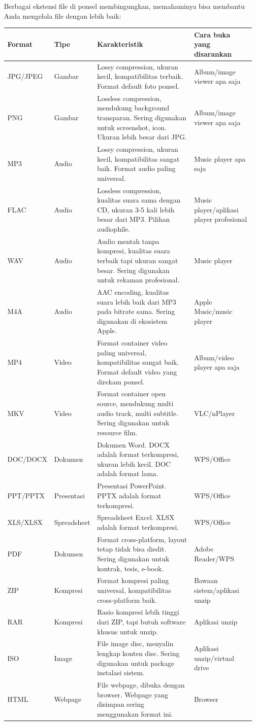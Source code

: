 Berbagai ekstensi file di ponsel membingungkan, memahaminya bisa membantu Anda mengelola file dengan lebih baik:

\begin{center}
\begin{tabularx}{\linewidth}{|X|X|X|X|}
\hline
\textbf{Format} & \textbf{Tipe} & \textbf{Karakteristik} & \textbf{Cara buka yang disarankan} \tabularnewline
\hline
JPG/JPEG & Gambar & Lossy compression, ukuran kecil, kompatibilitas terbaik. Format default foto ponsel. & Album/image viewer apa saja \tabularnewline
PNG & Gambar & Lossless compression, mendukung background transparan. Sering digunakan untuk screenshot, icon. Ukuran lebih besar dari JPG. & Album/image viewer apa saja \tabularnewline
MP3 & Audio & Lossy compression, ukuran kecil, kompatibilitas sangat baik. Format audio paling universal. & Music player apa saja \tabularnewline
FLAC & Audio & Lossless compression, kualitas suara sama dengan CD, ukuran 3-5 kali lebih besar dari MP3. Pilihan audiophile. & Music player/aplikasi player profesional \tabularnewline
WAV & Audio & Audio mentah tanpa kompresi, kualitas suara terbaik tapi ukuran sangat besar. Sering digunakan untuk rekaman profesional. & Music player \tabularnewline
M4A & Audio & AAC encoding, kualitas suara lebih baik dari MP3 pada bitrate sama. Sering digunakan di ekosistem Apple. & Apple Music/music player \tabularnewline
MP4 & Video & Format container video paling universal, kompatibilitas sangat baik. Format default video yang direkam ponsel. & Album/video player apa saja \tabularnewline
MKV & Video & Format container open source, mendukung multi audio track, multi subtitle. Sering digunakan untuk resource film. & VLC/nPlayer \tabularnewline
DOC/DOCX & Dokumen & Dokumen Word. DOCX adalah format terkompresi, ukuran lebih kecil. DOC adalah format lama. & WPS/Office \tabularnewline
PPT/PPTX & Presentasi & Presentasi PowerPoint. PPTX adalah format terkompresi. & WPS/Office \tabularnewline
XLS/XLSX & Spreadsheet & Spreadsheet Excel. XLSX adalah format terkompresi. & WPS/Office \tabularnewline
PDF & Dokumen & Format cross-platform, layout tetap tidak bisa diedit. Sering digunakan untuk kontrak, tesis, e-book. & Adobe Reader/WPS \tabularnewline
ZIP & Kompresi & Format kompresi paling universal, kompatibilitas cross-platform baik. & Bawaan sistem/aplikasi unzip \tabularnewline
RAR & Kompresi & Rasio kompresi lebih tinggi dari ZIP, tapi butuh software khusus untuk unzip. & Aplikasi unzip \tabularnewline
ISO & Image & File image disc, menyalin lengkap konten disc. Sering digunakan untuk package instalasi sistem. & Aplikasi unzip/virtual drive \tabularnewline
HTML & Webpage & File webpage, dibuka dengan browser. Webpage yang disimpan sering menggunakan format ini. & Browser \tabularnewline
\hline
\end{tabularx}
\end{center}


